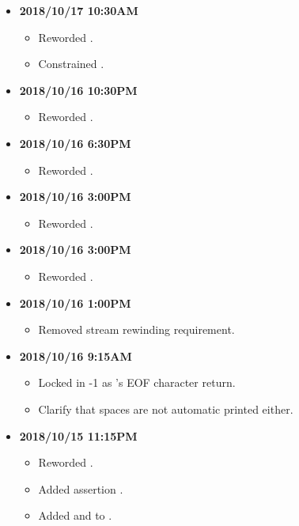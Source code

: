 \documentclass[../gazprea.tex]{subfiles}
\begin{document}
\begin{itemize}
\begin{itemize}
    \end{itemize}
  \item
    \textbf{2018/10/17 10:30AM}
    \begin{itemize}
      \item Reworded .
      \item Constrained  .
    \end{itemize}
  \item
    \textbf{2018/10/16 10:30PM}
    \begin{itemize}
      \item Reworded .
    \end{itemize}
  \item
    \textbf{2018/10/16 6:30PM}
    \begin{itemize}
      \item Reworded .
    \end{itemize}
  \item
    \textbf{2018/10/16 3:00PM}
    \begin{itemize}
      \item Reworded .
    \end{itemize}
  \item
    \textbf{2018/10/16 3:00PM}
    \begin{itemize}
      \item Reworded .
    \end{itemize}
  \item
    \textbf{2018/10/16 1:00PM}
    \begin{itemize}
      \item Removed stream rewinding requirement.
    \end{itemize}
  \item
    \textbf{2018/10/16 9:15AM}
    \begin{itemize}
      \item Locked in -1 as 's EOF character return.
      \item Clarify that spaces are not automatic printed either.
    \end{itemize}
  \item
    \textbf{2018/10/15 11:15PM}
    \begin{itemize}
      \item Reworded .
      \item Added assertion .
      \item Added  and  to .

\end{itemize}
\end{itemize}
\end{document}
